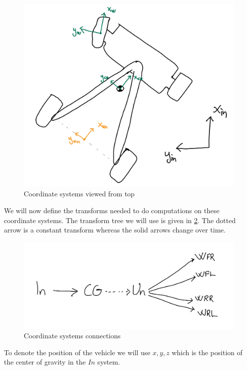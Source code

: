 \begin{figure}
    \centering
    \includegraphics[width=\textwidth]{sections/figures/top-coordinate-systems-sketch.jpeg}
    \caption{Coordinate systems viewed from top}
    \label{fig:coords-top}
\end{figure}

We will now define the transforms needed to do computations on these coordinate systems. The transform tree we will use is given in \cref{fig:transform-tree}. The dotted arrow is a constant transform whereas the solid arrows change over time.

\begin{figure}
    \centering
    \includegraphics[width=\textwidth]{sections/figures/coordinate-tree.jpeg}
    \caption{Coordinate systems connections}
    \label{fig:transform-tree}
\end{figure}


To denote the position of the vehicle we will use $x,y,z$ which is the position of the center of gravity in the $In$ system.


